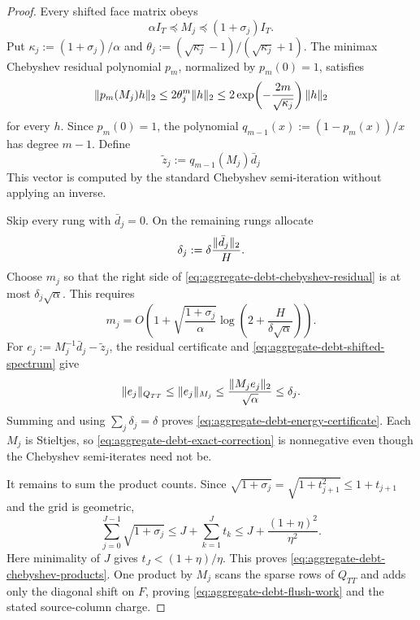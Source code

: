 \begin{proof}
Every shifted face matrix obeys
\begin{equation}
 \alpha I_T\preceq M_j\preceq(1+\sigma_j)I_T.
 \label{eq:aggregate-debt-shifted-spectrum}
\end{equation}
Put $\kappa_j:=(1+\sigma_j)/\alpha$ and
$\theta_j:=(\sqrt{\kappa_j}-1)/(\sqrt{\kappa_j}+1)$.  The minimax
Chebyshev residual polynomial $p_m$, normalized by $p_m(0)=1$, satisfies
\begin{equation}
 \lVert p_m(M_j)h\rVert_2
 \leq2\theta_j^m\lVert h\rVert_2
 \leq2\exp\!\left(-\frac{2m}{\sqrt{\kappa_j}}\right)\lVert h\rVert_2
 \label{eq:aggregate-debt-chebyshev-residual}
\end{equation}
for every $h$.  Since $p_m(0)=1$, the polynomial
$q_{m-1}(x):=(1-p_m(x))/x$ has degree $m-1$.  Define
\begin{equation*}
 \widetilde z_j:=q_{m-1}(M_j)\bar d_j
\end{equation*}
This vector is computed by the standard Chebyshev semi-iteration without applying an
inverse.

Skip every rung with $\bar d_j=0$.  On the remaining rungs allocate
\begin{equation*}
 \delta_j:=\delta\frac{\lVert\bar d_j\rVert_2}{H}.
\end{equation*}
Choose $m_j$ so that the right side of
\cref{eq:aggregate-debt-chebyshev-residual} is at most
$\delta_j\sqrt\alpha$.  This requires
\begin{equation*}
 m_j=O\!\left(
  1+\sqrt{\frac{1+\sigma_j}{\alpha}}
  \log\!\left(2+\frac{H}{\delta\sqrt\alpha}\right)
 \right).
\end{equation*}
For $e_j:=M_j^{-1}\bar d_j-\widetilde z_j$, the residual certificate and
\cref{eq:aggregate-debt-shifted-spectrum} give
\begin{equation*}
 \lVert e_j\rVert_{Q_{TT}}
 \leq\lVert e_j\rVert_{M_j}
 \leq\frac{\lVert M_je_j\rVert_2}{\sqrt\alpha}
 \leq\delta_j.
\end{equation*}
Summing and using $\sum_j\delta_j=\delta$ proves
\cref{eq:aggregate-debt-energy-certificate}.  Each $M_j$ is Stieltjes, so
\cref{eq:aggregate-debt-exact-correction} is nonnegative even though the
Chebyshev semi-iterates need not be.

It remains to sum the product counts.  Since
$\sqrt{1+\sigma_j}=\sqrt{1+t_{j+1}^2}\leq1+t_{j+1}$ and the grid is
geometric,
\begin{equation*}
 \sum_{j=0}^{J-1}\sqrt{1+\sigma_j}
 \leq J+\sum_{k=1}^{J}t_k
 \leq J+\frac{(1+\eta)^2}{\eta^2}.
\end{equation*}
Here minimality of $J$ gives $t_J<(1+\eta)/\eta$.  This proves
\cref{eq:aggregate-debt-chebyshev-products}.  One product by $M_j$ scans the
sparse rows of $Q_{TT}$ and adds only the diagonal shift on $F$, proving
\cref{eq:aggregate-debt-flush-work} and the stated source-column charge.


\end{proof}

